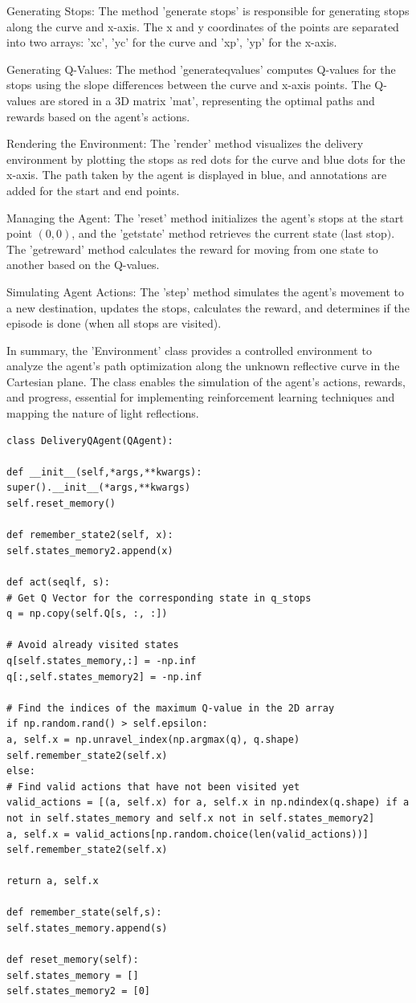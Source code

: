 \documentclass[12pt,a4paper,twoside]{report}
\begin{document}
Generating Stops:
The method 'generate stops' is responsible for generating stops along the curve and x-axis. The x and y coordinates of the points are separated into two arrays: 'xc', 'yc' for the curve and 'xp', 'yp' for the x-axis.

Generating Q-Values:
The method 'generateqvalues' computes Q-values for the stops using the slope differences between the curve and x-axis points. The Q-values are stored in a 3D matrix 'mat', representing the optimal paths and rewards based on the agent's actions.

Rendering the Environment:
The 'render' method visualizes the delivery environment by plotting the stops as red dots for the curve and blue dots for the x-axis. The path taken by the agent is displayed in blue, and annotations are added for the start and end points.

Managing the Agent:
The 'reset' method initializes the agent's stops at the start point $(0, 0)$, and the 'getstate' method retrieves the current state $($last stop$)$. The 'getreward' method calculates the reward for moving from one state to another based on the Q-values.

Simulating Agent Actions:
The 'step' method simulates the agent's movement to a new destination, updates the stops, calculates the reward, and determines if the episode is done (when all stops are visited).

In summary, the 'Environment' class provides a controlled environment to analyze the agent's path optimization along the unknown reflective curve in the Cartesian plane. The class enables the simulation of the agent's actions, rewards, and progress, essential for implementing reinforcement learning techniques and mapping the nature of light reflections.

\begin{lstlisting}
class DeliveryQAgent(QAgent):

def __init__(self,*args,**kwargs):
super().__init__(*args,**kwargs)
self.reset_memory()

def remember_state2(self, x):
self.states_memory2.append(x)

def act(seqlf, s):
# Get Q Vector for the corresponding state in q_stops
q = np.copy(self.Q[s, :, :])

# Avoid already visited states
q[self.states_memory,:] = -np.inf
q[:,self.states_memory2] = -np.inf

# Find the indices of the maximum Q-value in the 2D array
if np.random.rand() > self.epsilon:
a, self.x = np.unravel_index(np.argmax(q), q.shape)
self.remember_state2(self.x)
else:
# Find valid actions that have not been visited yet
valid_actions = [(a, self.x) for a, self.x in np.ndindex(q.shape) if a not in self.states_memory and self.x not in self.states_memory2]
a, self.x = valid_actions[np.random.choice(len(valid_actions))]
self.remember_state2(self.x)

return a, self.x

def remember_state(self,s):
self.states_memory.append(s)

def reset_memory(self):
self.states_memory = []
self.states_memory2 = [0]
	
\end{lstlisting}
\end{document}
